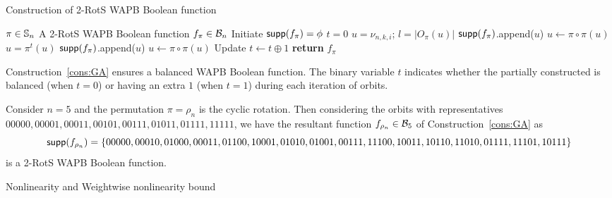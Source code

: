 \documentclass{llncs}
\begin{document}
\begin{constr}
\caption{Construction of 2-RotS WAPB Boolean function\label{cons:GA}}
\begin{algorithmic}
\Require $\pi \in \mathbb{S}_n$ %
\Ensure A 2-RotS WAPB Boolean function $f_\pi \in \mathcal{B}_n$
\State Initiate $\mathsf{supp}(f_\pi) = \phi$
\State $t = 0$
		\State $u = \nu_{n,k,i}$; $l= |O_\pi(u)|$
				\State $\mathsf{supp}(f_\pi)$.append($u$)
				\State $ u \gets \pi \circ \pi(u)$
			\EndFor
		\Else
			\State $u = \pi^{t}(u)$
				\State $\mathsf{supp}(f_\pi)$.append($u$)
				\State $ u \gets \pi \circ \pi(u)$ 
			\EndFor 
			\State Update $t \gets t \oplus 1$
		\EndIf
	\EndFor
\EndFor
\State \textbf{return} $f_\pi$
\end{algorithmic}

\end{constr}
Construction~\ref{cons:GA} ensures a balanced WAPB Boolean function. The binary variable $t$ indicates whether the partially constructed is balanced (when $t = 0$) or having an extra $1$ (when $t = 1$) during each iteration of orbits.
\begin{example}
Consider $n = 5$ and the permutation $\pi = \rho_n$ is the cyclic rotation. Then considering the orbits with representatives $00000, 00001, 00011, 00101, 00111, 01011, 01111, 11111$, we have the resultant function $f_{\rho_n} \in \mathcal{B}_{5}$ of Construction~\ref{cons:GA} as $$\mathsf{supp}(f_{\rho_n}) = \{00000, 00010, 01000, 00011, 01100, 10001, 01010, 01001, 00111, 11100, 10011, 10110, 11010, 01111, 11101, 10111\}$$
is a 2-RotS WAPB Boolean function.
\end{example}
\begin{theorem}
Nonlinearity and Weightwise nonlinearity bound
\end{theorem}
\end{document}
